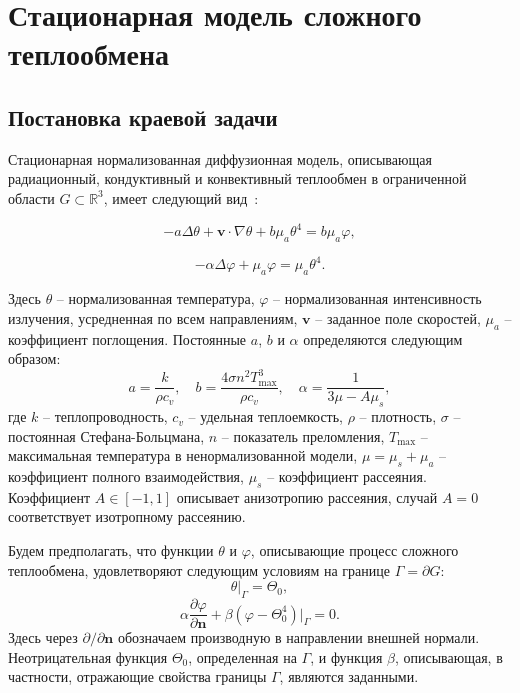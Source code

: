 \section{Стационарная модель сложного теплообмена}\label{sec:ch1/sec3}

\subsection{Постановка краевой задачи}
\label{subsec:ch1/sec3/state}

Стационарная нормализованная диффузионная модель, описывающая
радиационный, кондуктивный и конвективный теплообмен в
ограниченной области $G\subset \mathbb{R}^3$,
имеет следующий вид~\cite{modest2013radiative}:

\begin{equation}
    \label{eq:1_3:4-1}
    -a \Delta \theta + \textbf{v} \cdot \nabla \theta
    + b \mu_a \theta^4 =  b \mu_a \varphi,
\end{equation}

\begin{equation}
    \label{eq:1_3:4-2}
    - \alpha \Delta \varphi + \mu_a \varphi = \mu_a \theta^4.
\end{equation}

Здесь $\theta$ -- нормализованная температура, $\varphi$ --
нормализованная интенсивность излучения, усредненная по всем
направлениям, $\textbf{v}$ -- заданное поле скоростей, $\mu_a$ --
коэффициент поглощения.
Постоянные $a$, $b$ и $\alpha$
определяются следующим образом:
\[
    a=\frac{k}{\rho c_v},\quad b = \frac{4\sigma n^2 T_{\max}^3}{\rho c_v},
    \quad \alpha=\frac{1}{3\mu - A \mu_s},
\]
где $k$ -- теплопроводность, $c_v$ -- удельная теплоемкость, $\rho$ --
плотность, $\sigma$ -- постоянная Стефана-Больцмана, $n$ --
показатель преломления, $T_{\max}$ -- максимальная температура в
ненормализованной модели, $\mu = \mu_s + \mu_a$ -- коэффициент
полного взаимодействия, $\mu_s$ -- коэффициент рассеяния.
Коэффициент $A \in [-1, 1]$ описывает анизотропию рассеяния, случай
$A=0$ соответствует изотропному рассеянию.

Будем предполагать, что функции $\theta$ и $\varphi$, описывающие
процесс сложного теплообмена, удовлетворяют следующим условиям на
границе $\Gamma = \partial G$:
\begin{equation}
    \label{eq:1_3:4-3}
    \theta|_{\Gamma} = \Theta_0,
\end{equation}
\begin{equation}
    \label{eq:1_3:4-4}
    \alpha \frac{\partial \varphi}{\partial \mathbf{n}} + \beta
    (\varphi-\Theta_0^4)|_{\Gamma} = 0.
\end{equation}
Здесь через $\partial/\partial \mathbf{n}$ обозначаем производную
в направлении внешней нормали.
Неотрицательная функция
$\Theta_{0}$, определенная на $\Gamma$,  и функция $\beta$,
описывающая, в частности, отражающие свойства границы $\Gamma$,
являются заданными.


